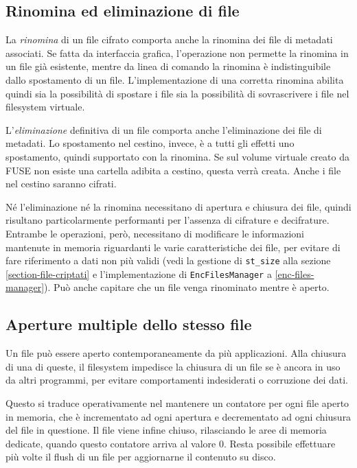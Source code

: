 \documentclass[a4paper,12pt,twoside,openright]{report}
\begin{document}
  \subsection{Rinomina ed eliminazione di file}

  La \textit{rinomina} di un file cifrato comporta anche la rinomina dei file di metadati associati.
  Se fatta da interfaccia grafica, l'operazione non permette la rinomina in un file già esistente,
  mentre da linea di comando la rinomina è indistinguibile dallo spostamento di un file.
  L'implementazione di una corretta rinomina abilita quindi sia la possibilità di spostare i file
  sia la possibilità di sovrascrivere i file nel filesystem virtuale.
  
  L'\textit{eliminazione} definitiva di un file comporta anche l'eliminazione dei file di metadati.
  Lo spostamento nel cestino, invece, è a tutti gli effetti uno spostamento, quindi supportato con la rinomina.
  Se sul volume virtuale creato da FUSE non esiste una cartella adibita a cestino, questa verrà creata.
  Anche i file nel cestino saranno cifrati.

  Né l'eliminazione né la rinomina necessitano di apertura e chiusura dei file, quindi risultano particolarmente
  performanti per l'assenza di cifrature e decifrature.
  Entrambe le operazioni, però, necessitano di modificare le informazioni mantenute in memoria
  riguardanti le varie caratteristiche dei file, per evitare di fare riferimento a dati non più validi
  (vedi la gestione di \texttt{st\_size} alla sezione \ref{section-file-criptati} e l'implementazione
  di \texttt{EncFilesManager} a \ref{enc-files-manager}).
  Può anche capitare che un file venga rinominato mentre è aperto.

  \subsection{Aperture multiple dello stesso file}
  \label{aperture-multiple-file}

  Un file può essere aperto contemporaneamente da più applicazioni. Alla chiusura di una
  di queste, il filesystem impedisce la chiusura di un file se è ancora in uso da
  altri programmi, per evitare comportamenti indesiderati o corruzione dei dati.

  Questo si traduce operativamente nel mantenere un contatore per ogni file aperto in memoria,
  che è incrementato ad ogni apertura e decrementato ad ogni chiusura del file in questione.
  Il file viene infine chiuso, rilasciando le aree di memoria dedicate, quando questo
  contatore arriva al valore 0. Resta possibile effettuare più volte il flush di un file
  per aggiornarne il contenuto su disco.
\end{document}

